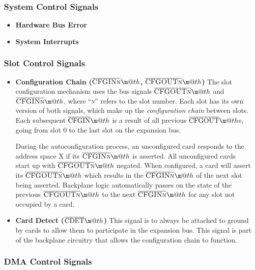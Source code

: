 \documentclass{article}
\makeatletter
\newcommand*{\textoverline}[1]{$\overline{\hbox{#1}}\m@th$}
\makeatother
\begin{document}
\subsubsection{System Control Signals}

\begin{itemize}
	\item{\textbf{Hardware Bus Error}}

	\item{\textbf{System Interrupts}}
\end{itemize}

\subsubsection{Slot Control Signals}

\begin{itemize}

	\item{\textbf{Configuration Chain
	(\textoverline{\scshape CFGINn},
	\textoverline{\scshape CFGOUTn})}} The slot configuration mechanism uses
	the bus signals \textoverline{\scshape CFGOUTn} and
	\textoverline{\scshape CFGINn}, where ``\textsc{n}'' refers to the slot
	number. Each slot has its own version of both signals, which make up the
	\textit{configuration chain} between slots. Each subsequent
	\textoverline{CFGIN} is a result of all previous
	\textoverline{CFGOUT}s, going from slot 0 to the last slot on the
	expansion bus.

	During the autoconfiguration process, an unconfigured card responds to
	the address space X if its \textoverline{\scshape CFGINn} is asserted.
	All unconfigured cards start up with \textoverline{\scshape CFGOUTn}
	negated. When configured, a card will assert its
	\textoverline{\scshape CFGOUTn} which results in the
	\textoverline{\scshape CFGINn} of the next slot being asserted.
	Backplane logic automatically passes on the state of the previous
	\textoverline{\scshape CFGOUTn} to the next
	\textoverline{\scshape CFGINn} for any slot not occupied by a card.

	\item{\textbf{Card Detect (\textoverline{CDET})}} This signal is to
	always be attached to ground by cards to allow them to participate in
	the expansion bus. This signal is part of the backplane circuitry that
	allows the configuration chain to function.

\end{itemize}

\subsubsection{DMA Control Signals}
\end{document}
